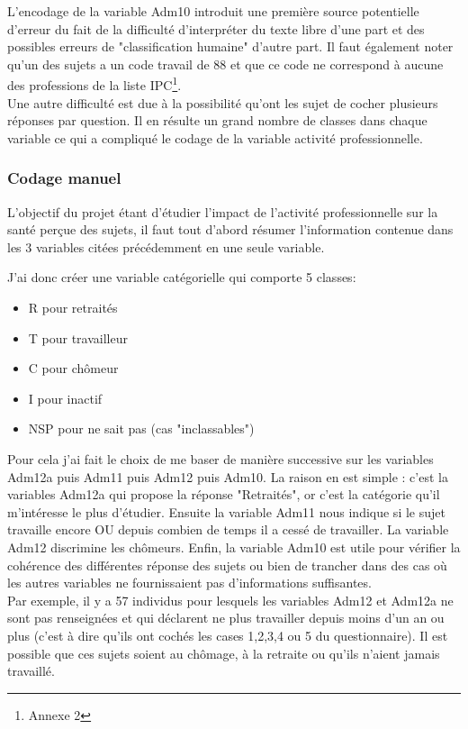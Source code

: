 \documentclass{book}
\begin{document}
\noindent
L'encodage de la variable Adm10 introduit une première source potentielle d'erreur du fait de la difficulté d'interpréter du texte libre d'une part et des possibles erreurs de "classification humaine" d'autre part. Il faut également noter qu'un des sujets a un code travail de 88 et que ce code ne correspond à aucune des professions de la liste IPC\footnote{Annexe 2}.\\

\noindent
Une autre difficulté est due à la possibilité qu'ont les sujet de cocher plusieurs réponses par question. Il en résulte un grand nombre de classes dans chaque variable ce qui a compliqué le codage de la variable activité professionnelle.

\subsubsection{Codage manuel}
\noindent
L'objectif du projet étant d'étudier l'impact de l'activité professionnelle sur la santé perçue des sujets, il faut tout d'abord résumer l'information contenue dans les 3 variables citées précédemment en une seule variable.

\noindent
J'ai donc créer une variable catégorielle qui comporte 5 classes:
\begin{itemize}[label=\textbullet, font=\small \color{black} ]
\item R pour retraités
\item T pour travailleur
\item C pour chômeur
\item I pour inactif
\item NSP pour ne sait pas (cas "inclassables")
\end{itemize}

\noindent
Pour cela j'ai fait le choix de me baser de manière successive sur les variables Adm12a puis Adm11 puis Adm12 puis Adm10. La raison en est simple : c'est la variables Adm12a qui propose la réponse "Retraités", or c'est la catégorie qu'il m'intéresse le plus d'étudier. Ensuite la variable Adm11 nous indique si le sujet travaille encore OU depuis combien de temps il a cessé de travailler. La variable Adm12 discrimine les chômeurs. Enfin, la variable Adm10 est utile pour vérifier la cohérence des différentes réponse des sujets ou bien de trancher dans des cas où les autres variables ne fournissaient pas d'informations suffisantes.\\

\noindent
Par exemple, il y a 57 individus pour lesquels les variables Adm12 et Adm12a ne sont pas renseignées et qui déclarent ne plus travailler depuis moins d'un an ou plus (c'est à dire qu'ils ont cochés les cases 1,2,3,4 ou 5 du questionnaire). Il est possible que ces sujets soient au chômage, à la retraite ou qu'ils n'aient jamais travaillé.\\
\end{document}

